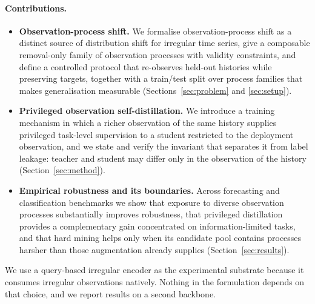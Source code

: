 \paragraph{Contributions.}
\begin{itemize}
\item \textbf{Observation-process shift.} We formalise observation-process shift as a distinct source of
distribution shift for irregular time series, give a composable removal-only family of observation processes
with validity constraints, and define a controlled protocol that re-observes held-out histories while preserving
targets, together with a train/test split over process families that makes generalisation measurable
(Sections~\ref{sec:problem} and \ref{sec:setup}).
\item \textbf{Privileged observation self-distillation.} We introduce a training mechanism in which a richer
observation of the same history supplies privileged task-level supervision to a student restricted to the
deployment observation, and we state and verify the invariant that separates it from label leakage: teacher and
student may differ only in the observation of the history (Section~\ref{sec:method}).
\item \textbf{Empirical robustness and its boundaries.} Across forecasting and classification benchmarks we show
that exposure to diverse observation processes substantially improves robustness, that privileged distillation
provides a complementary gain concentrated on information-limited tasks, and that hard mining helps only when its
candidate pool contains processes harsher than those augmentation already supplies (Section~\ref{sec:results}).
\end{itemize}

We use a query-based irregular encoder \cite{lim2026quite} as the experimental substrate because it consumes
irregular observations natively. Nothing in the formulation depends on that choice, and we report results on a
second backbone.
